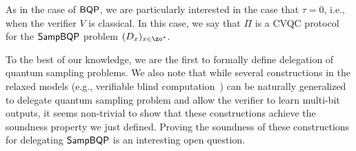 As in the case of $\operatorname{\mathsf{BQP}}$, we are particularly interested in the case that $\tau = 0$, i.e., when the verifier $V$ is classical. In this case, we say that $\Pi$ is a CVQC protocol for the $\operatorname{\mathsf{SampBQP}}$ problem $(D_x)_{x\in\zo^*}$.

To the best of our knowledge, we are the first to formally define delegation of quantum sampling problems. We also note that while several constructions in the relaxed models (e.g., verifiable blind computation~\cite{FK17}) can be naturally generalized to delegate quantum sampling problem and allow the verifier to learn multi-bit outputs, it seems non-trivial to show that these constructions achieve the soundness property we just defined. Proving the soundness of these constructions for delegating $\operatorname{\mathsf{SampBQP}}$ is an interesting open question.

